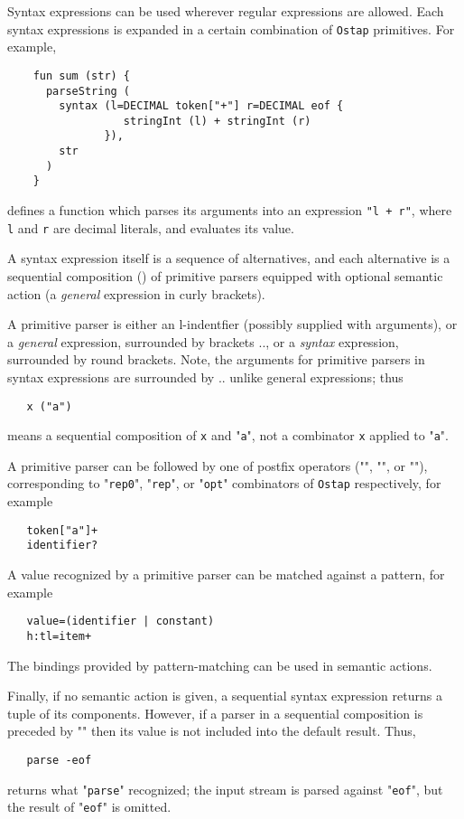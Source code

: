 Syntax expressions can be used wherever regular expressions are allowed. Each syntax expressions is expanded in a certain combination of \lstinline|Ostap| primitives.
For example,

\begin{lstlisting}
    fun sum (str) {
      parseString (
        syntax (l=DECIMAL token["+"] r=DECIMAL eof {
                  stringInt (l) + stringInt (r)
               }),
        str
      )
    }
\end{lstlisting}

defines a function which parses its arguments into an expression \lstinline|"l + r"|, where \lstinline|l| and \lstinline|r| are decimal literals, and evaluates its value.

A syntax expression itself is a sequence of alternatives, and each alternative is a sequential composition () of primitive parsers equipped with optional
semantic action (a \emph{general} expression in curly brackets).

A primitive parser is either an l-indentfier (possibly supplied with arguments), or a \emph{general} expression, surrounded by brackets \term{\$(}..\term{)},
or a \emph{syntax} expression, surrounded by round brackets. Note, the arguments for primitive parsers in syntax expressions are surrounded by
\term{[}..\term{]} unlike general expressions; thus

\begin{lstlisting}
   x ("a")
\end{lstlisting}

means a sequential composition of \lstinline|x| and "\lstinline|a|", not a combinator \lstinline|x| applied to "\lstinline|a|". 

A primitive parser can be followed by one of postfix operators ("\term{*}", "\term{+}", or ""), corresponding
to "\lstinline|rep0|",  "\lstinline|rep|", or "\lstinline|opt|" combinators of \lstinline|Ostap| respectively, for example

\begin{lstlisting}
   token["a"]+
   identifier? 
\end{lstlisting}

A value recognized by a primitive parser can be matched against a pattern, for example

\begin{lstlisting}
   value=(identifier | constant)
   h:tl=item+
\end{lstlisting}

The bindings provided by pattern-matching can be used in semantic actions.

Finally, if no semantic action is given, a sequential syntax expression returns a tuple of its components. However, if a parser
in a sequential composition is preceded by "\term{-}" then its value is not included into the default result. Thus,

\begin{lstlisting}
   parse -eof
\end{lstlisting}

returns what "\lstinline|parse|" recognized; the input stream is parsed against "\lstinline|eof|", but the result of "\lstinline|eof|"
is omitted.
